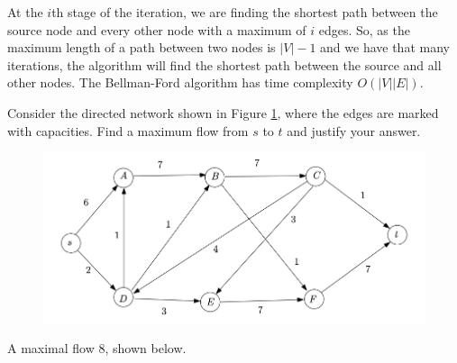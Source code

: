 \begin{solution}
    At the $i$th stage of the iteration, we are finding the shortest path between
    the source node and every other node with a maximum of $i$ edges.
    So, as the maximum length of a path between two nodes is $\lvert V \rvert - 1$
    and we have that many iterations,
    the algorithm will find the shortest path between the source and all
    other nodes.
    The Bellman-Ford algorithm has time complexity 
    $O(\lvert V \rvert \lvert E \rvert)$.
\end{solution}

\question Consider the directed network shown in Figure \ref{fig:pc-01-2}, where the edges are marked
with capacities.
Find a maximum flow from $s$ to $t$ and justify your answer.

\begin{figure}[]
    \centering
    \includegraphics[width=0.8\linewidth]{images/pc-01-2}
    \caption{}
    \label{fig:pc-01-2}
\end{figure}

\begin{solution}
    A maximal flow $8$, shown below.
    \begin{center}
    \end{center}
\end{solution}

